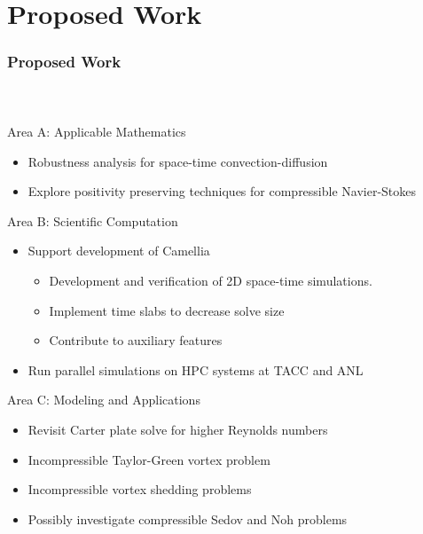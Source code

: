 \documentclass[18pt,xcolor=table]{beamer}
\let\oldfootnotesize\footnotesize
\renewcommand*{\footnotesize}{\oldfootnotesize\tiny}
\begin{document}
\section{Proposed Work}
\begin{frame}[t]
\frametitle{Proposed Work}
\framesubtitle{~~}  %
\vspace{-3ex}
Area A: Applicable Mathematics
\begin{itemize}
  \item Robustness analysis for space-time convection-diffusion
  \item Explore positivity preserving techniques for compressible Navier-Stokes
\end{itemize}
\smallskip

Area B: Scientific Computation
\begin{itemize}
  \item Support development of Camellia
  \begin{itemize}
    \item Development and verification of 2D space-time simulations.
    \item Implement time slabs to decrease solve size
    \item Contribute to auxiliary features
  \end{itemize}
  \item Run parallel simulations on HPC systems at TACC and ANL
\end{itemize}
\smallskip

Area C: Modeling and Applications
\begin{itemize}
  \item Revisit Carter plate solve for higher Reynolds numbers
  \item Incompressible Taylor-Green vortex problem
  \item Incompressible vortex shedding problems
  \item Possibly investigate compressible Sedov and Noh problems
\end{itemize}
\end{frame}


\end{document}
